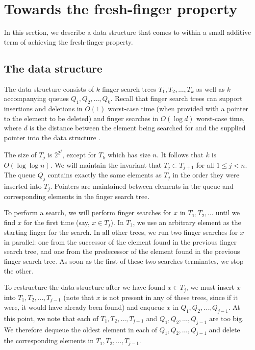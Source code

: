 \documentclass{llncs}
\newcommand{\BigOh}[1]{O\!\left(#1\right)}
\begin{document}
\section{Towards the fresh-finger property}
\label{section:main}

In this section, we describe a data structure that comes to within a small additive term of achieving the fresh-finger property.

\subsection{The data structure}
\label{section:main:datastructure}

The data structure consists of $k$ finger search trees $T_1,T_2,\ldots,T_k$ as well as $k$ accompanying queues $Q_1,Q_2,\ldots,Q_k$. Recall that finger search trees can support insertions and deletions in $\BigOh{1}$ worst-case time (when provided with a pointer to the element to be deleted) and finger searches in $\BigOh{\log d}$ worst-case time, where $d$ is the distance between the element being searched for and the supplied pointer into the data structure \cite{DBLP:journals/jcss/BrodalLMTT03}. %

The size of $T_j$ is $2^{2^j}$, except for $T_k$ which has size $n$. It follows that $k$ is $\BigOh{\log \log n}$. We will maintain the invariant that $T_j \subset T_{j+1}$ for all $1 \le j < n$. The queue $Q_j$ contains exactly the same elements as $T_j$ in the order they were inserted into $T_j$. Pointers are maintained between elements in the queue and corresponding elements in the finger search tree.

To perform a search, we will perform finger searches for $x$ in $T_1,T_2,\ldots$ until we find $x$ for the first time (say, $x \in T_j$). In $T_1$, we use an arbitrary element as the starting finger for the search. In all other trees, we run two finger searches for $x$ in parallel: one from the successor of the element found in the previous finger search tree, and one from the predecessor of the element found in the previous finger search tree. As soon as the first of these two searches terminates, we stop the other. 

To restructure the data structure after we have found $x \in T_j$, we must insert $x$ into $T_1,T_2,\ldots,T_{j-1}$ (note that $x$ is not present in any of these trees, since if it were, it would have already been found) and enqueue $x$ in $Q_1,Q_2,\ldots,Q_{j-1}$. At this point, we note that each of $T_1,T_2,\ldots,T_{j-1}$ and $Q_1,Q_2,\ldots,Q_{j-1}$ are too big. We therefore dequeue the oldest element in each of $Q_1,Q_2,\ldots,Q_{j-1}$ and delete the corresponding elements in $T_1,T_2,\ldots,T_{j-1}$.
\end{document}

